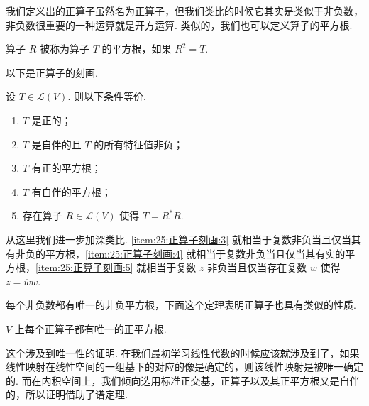 我们定义出的正算子虽然名为正算子，但我们类比的时候它其实是类似于非负数，非负数很重要的一种运算就是开方运算. 类似的，我们也可以定义算子的平方根.

\begin{definition}[平方根] 
    算子 $ R $ 被称为算子 $ T $ 的平方根，如果 $ R^{2} = T $.
\end{definition}

以下是正算子的刻画.

\begin{theorem}
    设 $ T \in \mathcal{L}(V) $. 则以下条件等价.
    \begin{enumerate}
        \item \label{item:25:正算子刻画:1}
              $ T $ 是正的；

        \item \label{item:25:正算子刻画:2}
              $ T $ 是自伴的且 $ T $ 的所有特征值非负；

        \item \label{item:25:正算子刻画:3}
              $ T $ 有正的平方根；

        \item \label{item:25:正算子刻画:4}
              $ T $ 有自伴的平方根；

        \item \label{item:25:正算子刻画:5}
              存在算子 $ R \in \mathcal{L}(V) $ 使得 $ T = R^{*}R $.
    \end{enumerate}
\end{theorem}

从这里我们进一步加深类比. \ref*{item:25:正算子刻画:3} 就相当于复数非负当且仅当其有非负的平方根，\ref*{item:25:正算子刻画:4} 就相当于复数非负当且仅当其有实的平方根，\ref*{item:25:正算子刻画:5} 就相当于复数 $ z $ 非负当且仅当存在复数 $ w $ 使得 $ z = \overline{w}w $.

每个非负数都有唯一的非负平方根，下面这个定理表明正算子也具有类似的性质.

\begin{theorem}
    $ V $ 上每个正算子都有唯一的正平方根.
\end{theorem}

这个涉及到唯一性的证明. 在我们最初学习线性代数的时候应该就涉及到了，如果线性映射在线性空间的一组基下的对应的像是确定的，则该线性映射是被唯一确定的. 而在内积空间上，我们倾向选用标准正交基，正算子以及其正平方根又是自伴的，所以证明借助了谱定理.

